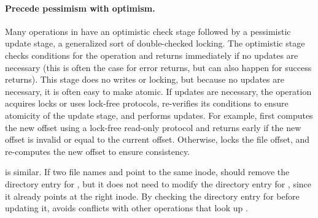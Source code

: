 



\paragraph{Precede pessimism with optimism.} Many operations
in \fs have an optimistic check stage followed by a pessimistic update
stage, a generalized sort of double-checked locking.  The optimistic
stage checks conditions for the operation and returns immediately if
no updates are necessary (this is often the case for error returns,
but can also happen for success returns).  This stage does no writes
or locking, but because no updates are necessary, it is often easy to
make atomic.  If updates are necessary, the operation acquires
locks or uses lock-free protocols, re-verifies its conditions to
ensure atomicity of the update stage, and performs updates.  For
example,  first computes the new offset using a lock-free
read-only protocol and returns early if the new offset is invalid or
equal to the current offset.  Otherwise,  locks the file
offset, and re-computes the new offset to ensure consistency.

 is similar.  If two file names  and 
point to the
same inode,  should remove the directory entry for
, but it does not need to modify the directory entry for
, since
it already points at the right inode.  By checking the directory
entry for  before updating it,  avoids
conflicts with other operations that look up .


